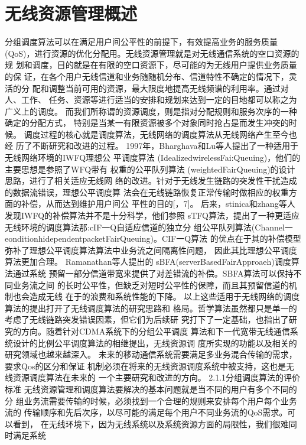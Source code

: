 \section{无线资源管理概述}
分组调度算法可以在满足用户间公平性的前提下，有效提高业务的服务质量
(QoS)，进行资源的优化分配用。无线资源管理就是对无线通信系统的空口资源的规
划和调度，目的就是在有限的空口资源下，尽可能的为无线用户提供业务质量的保
证，在各个用户无线信道和业务随随机分布、信道特性不确定的情况下，灵活的分
配和调整当前可用的资源，最大限度地提高无线频谱的利用率。通过对人、工作、
任务、资源等进行适当的安排和规划来达到一定的目地都可以称之为广义上的调度。
而我们所称谓的资源调度，则是指对分配规则和服务次序的一种确定的分配方式，
特别是当某一有限资源被多个对象同时抢占是而发生冲突的时候。
调度过程的核心就是调度算法，无线网络的调度算法从无线网络产生至今也经
历了不断研究和改进的过程。
1997年，Bharghava和Lu等人提出了一种适用于无线网络环境的IWFQ理想公
平调度算法  (IdealizedwirelessFai:Queuing)，他们的主要思想是参照了WFQ带有
权重的公平队列算法  (weightedFairQueuing)的设计思路，进行了相关适应无线网
络的改进。针对于无线发生链路的突发性干扰造成的数据流错误，理想公平调度算
法会在无线链路恢复正常传输时做相应的权重方面的补偿，从而达到维护用户间公
平性的目的[，7]。
后来，stinica和zhang等人发现IWFQ的补偿算法并不是十分科学，他们参照
sTFQ算法，提出了一种更适应无线环境的调度算法那:cIF一Q自适应信道的独立分
组公平队列算法(Channel一    eonditionhidependentpacketFairQueuing)。CIF一Q算法
的优点在于其的补偿模型弥补了理想公平调度算法算法中业务流之间隔离性问题，
因此其比理想公平调度算法更加合理。
Ramanathan等人提出的   sBFA(serverBasedFairApproaeh)调度算法通过系统
预留一部分信道带宽来提供了对差错流的补偿。SBFA算法可以保持不同业务流之间
的长时公平性，但缺乏对短时公平性的保障，而且其预留信道的机制也会造成无线
在于的浪费和系统性能的下降。
以上这些适用于无线网络的调度算法的提出打开了无线调度算法的研究思路和
格局。哲学算法虽然都只是单一的考虑了无线链路突发错误因素，但它们为后续研
究打下了一定基础，也指出了研究的方向。随着针对CDMA系统下的分组公平调度
算法和下一代宽带无线通信系统设计的比例公平调度算法的相继提出，无线资源调
度所实现的功能以及相关的研究领域也越来越深入。
未来的移动通信系统需要满足多业务混合传输的需求，要求Qos的区分和保证
机制必须在将来的无线资源调度系统中被支持，这也是无线资源调度算法在未来的
一个主要研究和改进的方向。
2.1.1分组调度算法的评价标准
无线资源管理和调度算法要解决的基本问题就是当不同的用户有多个不同的分
组业务流需要传输的时候，必须找到一个合理的规则来安排每个用户每个业务流的
传输顺序和先后次序，以尽可能的满足每个用户不同业务流的QoS需求。可以看到，
在无线环境下，因为无线系统以及系统资源方面的局限性，我们很难同时满足系统
